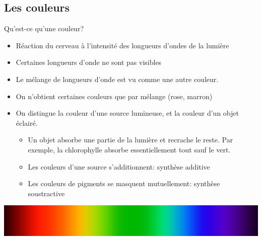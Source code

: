 \subsection{Les couleurs}
\begin{frame}{Qu'est-ce qu'une couleur?}
  \begin{itemize}
  \item Réaction du cerveau à l'intensité des longueurs d'ondes de la lumière
  \item Certaines longueurs d'onde ne sont pas visibles
  \item Le mélange de longueurs d'onde est vu comme une autre couleur.
  \item On n'obtient certaines couleurs que par mélange (rose, marron)
  \item On distingue la couleur d'une source lumineuse, et la couleur d'un
    objet éclairé.
    \begin{itemize}
    \item[\ddialogwarning] Un objet absorbe une partie de la lumière et
      recrache le reste. Par exemple, la chlorophylle absorbe essentiellement
      tout sauf le vert.
    \item Les couleurs d'une source s'additionnent: synthèse additive
    \item Les couleurs de pigments se masquent mutuellement: synthèse
      soustractive
    \end{itemize}
  \end{itemize}
  \begin{center}
    \includegraphics[width=.8\linewidth]{img/06/Spectrum_roygbiv.jpg}
  \end{center}
\end{frame}
